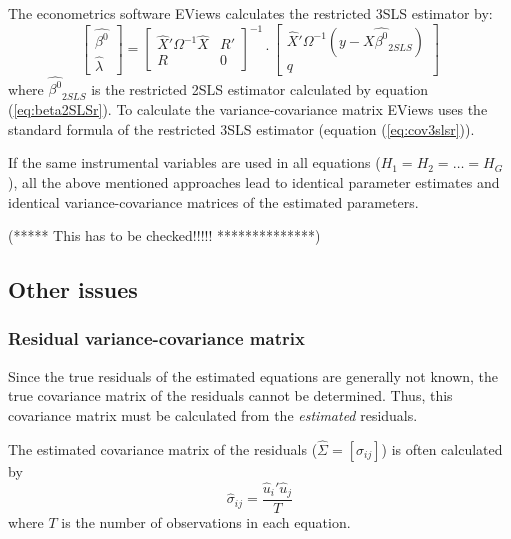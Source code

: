 \documentclass[article]{jss}
\begin{document}
The econometrics software EViews calculates the restricted 3SLS estimator by:
\begin{equation}
   \left[ \begin{array}{c}
      \widehat{\beta^0} \\ \widehat{\lambda}
   \end{array} \right]
   =
   \left[ \begin{array}{cc}
      \widehat{X}' \Omega^{-1} \widehat{X} & R' \\ 
      R & 0
   \end{array} \right]^{-1}
   \cdot
   \left[ \begin{array}{c}
      \widehat{X}' \Omega^{-1} \left( y - X \widehat{\beta^0}_{2SLS} \right) 
      \\ q 
   \end{array} \right]
\end{equation}
where $\widehat{\beta^0}_{2SLS}$ is the restricted 2SLS estimator calculated
by equation (\ref{eq:beta2SLSr}). 
To calculate the variance-covariance matrix 
EViews uses the standard formula of the restricted 3SLS estimator
(equation (\ref{eq:cov3slsr})).


If the same instrumental variables are used in all equations 
($H_1 = H_2 = \ldots = H_G$), 
all the above mentioned approaches lead to identical parameter estimates
and identical variance-covariance matrices of the estimated parameters.

(***** This has to be checked!!!!! **************)


\subsection{Other issues}


\subsubsection{Residual variance-covariance matrix}\label{sec:residcov}

Since the true residuals of the estimated equations are generally not known,
the true covariance matrix of the residuals cannot be determined.
Thus, this covariance matrix must be calculated from the
\emph{estimated} residuals. 

The estimated covariance matrix of the residuals ($\widehat{\Sigma} = 
\left[ \widehat{\sigma}_{ij} \right]$) 
is often calculated by
\begin{equation}
   \widehat{\sigma}_{ij} = \frac{ \widehat{u}_i' \widehat{u}_j }{ T }
   \label{eq:rcov0}
\end{equation}
where $T$ is the number of observations in each equation.
\end{document}
